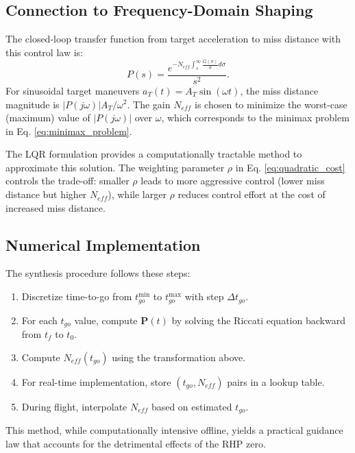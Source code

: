 \documentclass[11pt,a4paper]{article}
\begin{document}
\subsection{Connection to Frequency-Domain Shaping}
The closed-loop transfer function from target acceleration to miss distance with this control law is:
\begin{equation}
P(s) = \frac{e^{-N_{eff} \int_s^\infty \frac{G(\sigma)}{\sigma} d\sigma}}{s^2}.
\end{equation}
For sinusoidal target maneuvers $a_T(t) = A_T \sin(\omega t)$, the miss distance magnitude is $|P(j\omega)|A_T/\omega^2$. The gain $N_{eff}$ is chosen to minimize the worst-case (maximum) value of $|P(j\omega)|$ over $\omega$, which corresponds to the minimax problem in Eq. \eqref{eq:minimax_problem}.

The LQR formulation provides a computationally tractable method to approximate this solution. The weighting parameter $\rho$ in Eq. \eqref{eq:quadratic_cost} controls the trade-off: smaller $\rho$ leads to more aggressive control (lower miss distance but higher $N_{eff}$), while larger $\rho$ reduces control effort at the cost of increased miss distance.

\subsection{Numerical Implementation}
The synthesis procedure follows these steps:
\begin{enumerate}
    \item Discretize time-to-go from $t_{go}^{\min}$ to $t_{go}^{\max}$ with step $\Delta t_{go}$.
    \item For each $t_{go}$ value, compute $\mathbf{P}(t)$ by solving the Riccati equation backward from $t_f$ to $t_0$.
    \item Compute $N_{eff}(t_{go})$ using the transformation above.
    \item For real-time implementation, store $(t_{go}, N_{eff})$ pairs in a lookup table.
    \item During flight, interpolate $N_{eff}$ based on estimated $t_{go}$.
\end{enumerate}
This method, while computationally intensive offline, yields a practical guidance law that accounts for the detrimental effects of the RHP zero.


\end{document}
